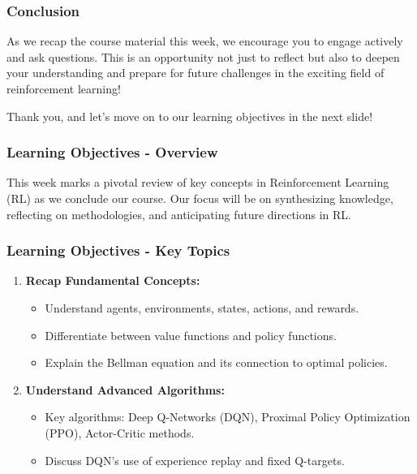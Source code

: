 \documentclass[aspectratio=169]{beamer}
\begin{document}
\begin{frame}[fragile]
    \frametitle{Conclusion}
    As we recap the course material this week, we encourage you to engage actively and ask questions. This is an opportunity not just to reflect but also to deepen your understanding and prepare for future challenges in the exciting field of reinforcement learning!
    
    Thank you, and let’s move on to our learning objectives in the next slide!
\end{frame}

\begin{frame}[fragile]
    \frametitle{Learning Objectives - Overview}
    This week marks a pivotal review of key concepts in Reinforcement Learning (RL) as we conclude our course. 
    Our focus will be on synthesizing knowledge, reflecting on methodologies, and anticipating future directions in RL.
\end{frame}

\begin{frame}[fragile]
    \frametitle{Learning Objectives - Key Topics}
    \begin{enumerate}
        \item \textbf{Recap Fundamental Concepts:}
            \begin{itemize}
                \item Understand agents, environments, states, actions, and rewards.
                \item Differentiate between value functions and policy functions.
                \item Explain the Bellman equation and its connection to optimal policies.
            \end{itemize}
        \item \textbf{Understand Advanced Algorithms:}
            \begin{itemize}
                \item Key algorithms: Deep Q-Networks (DQN), Proximal Policy Optimization (PPO), Actor-Critic methods.
                \item Discuss DQN's use of experience replay and fixed Q-targets.
            \end{itemize}
    \end{enumerate}
\end{frame}
\end{document}

